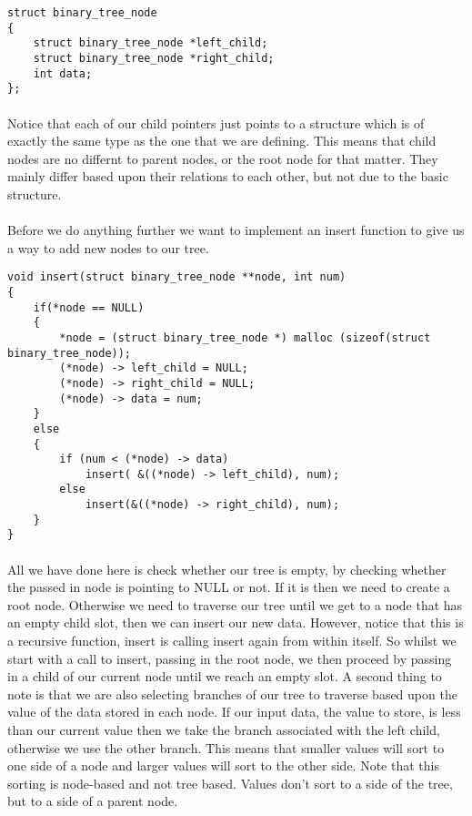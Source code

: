 \documentclass[10pt, a4paper, twosize]{article}
\begin{document}
\begin{lstlisting}
struct binary_tree_node
{
    struct binary_tree_node *left_child;
    struct binary_tree_node *right_child;
    int data;
};
\end{lstlisting}
\paragraph{} Notice that each of our child pointers just points to a structure which is of exactly the same type as the one that we are defining. This means that child nodes are no differnt to parent nodes, or the root node for that matter. They mainly differ based upon their relations to each other, but not due to the basic structure.

\paragraph{} Before we do anything further we want to implement an insert function to give us a way to add new nodes to our tree.
\begin{lstlisting}
void insert(struct binary_tree_node **node, int num)
{
    if(*node == NULL)
    {
        *node = (struct binary_tree_node *) malloc (sizeof(struct binary_tree_node));
        (*node) -> left_child = NULL;
        (*node) -> right_child = NULL;
        (*node) -> data = num;
    }
    else
    {
        if (num < (*node) -> data)
            insert( &((*node) -> left_child), num);
        else
            insert(&((*node) -> right_child), num);
    }
}
\end{lstlisting}
\paragraph{} All we have done here is check whether our tree is empty, by checking whether the passed in node is pointing to NULL or not. If it is then we need to create a root node. Otherwise we need to traverse our tree until we get to a node that has an empty child slot, then we can insert our new data. However, notice that this is a recursive function, insert is calling insert again from within itself. So whilst we start with a call to insert, passing in the root node, we then proceed by passing in a child of our current node until we reach an empty slot. A second thing to note is that we are also selecting branches of our tree to traverse based upon the value of the data stored in each node. If our input data, the value to store, is less than our current value then we take the branch associated with the left child, otherwise we use the other branch. This means that smaller values will sort to one side of a node and larger values will sort to the other side. Note that this sorting is node-based and not tree based. Values don't sort to a side of the tree, but to a side of a parent node.
\end{document}
